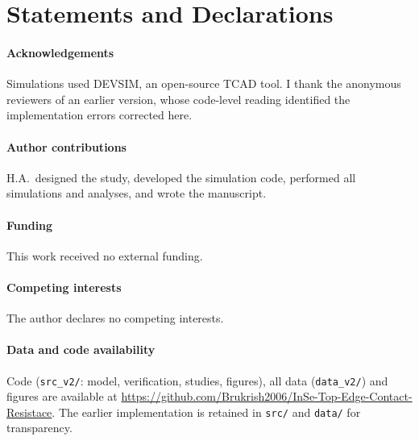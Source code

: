 \documentclass[11pt]{article}
\begin{document}
\section*{Statements and Declarations}
\paragraph{Acknowledgements} Simulations used DEVSIM, an open-source TCAD tool. I thank the anonymous reviewers of an earlier version, whose code-level reading identified the implementation errors corrected here.
\paragraph{Author contributions} H.A.\ designed the study, developed the simulation code, performed all simulations and analyses, and wrote the manuscript.
\paragraph{Funding} This work received no external funding.
\paragraph{Competing interests} The author declares no competing interests.
\paragraph{Data and code availability} Code (\texttt{src\_v2/}: model, verification, studies, figures), all data (\texttt{data\_v2/}) and figures are available at \url{https://github.com/Brukrish2006/InSe-Top-Edge-Contact-Resistace}. The earlier implementation is retained in \texttt{src/} and \texttt{data/} for transparency.
\end{document}
